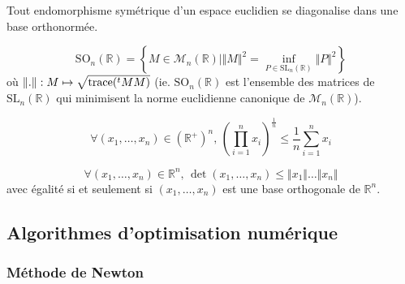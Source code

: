   \begin{application}
    Tout endomorphisme symétrique d'un espace euclidien se diagonalise dans une base orthonormée.
  \end{application}


  \begin{application}
    \[ \mathrm{SO}_n(\mathbb{R}) = \left\{ M \in \mathcal{M}_n(\mathbb{R}) \mid \Vert M \Vert^2 = \inf_{P \in \mathrm{SL}_n(\mathbb{R})} \Vert P \Vert^2 \right\} \]
    où $\Vert . \Vert : M \mapsto \sqrt{\operatorname{trace}(\mathstrut ^t MM)}$ (ie. $\mathrm{SO}_n(\mathbb{R})$ est l'ensemble des matrices de $\mathrm{SL}_n(\mathbb{R})$ qui minimisent la norme euclidienne canonique de $\mathcal{M}_n(\mathbb{R})$).
  \end{application}


  \begin{application}
    \[ \forall (x_1, \dots, x_n) \in (\mathbb{R}^+)^n, \, \left( \prod_{i=1}^{n} x_i \right)^{\frac{1}{n}} \leq \frac{1}{n} \sum_{i=1}^n x_i \]
  \end{application}


  \begin{application}
    \[ \forall (x_1, \dots, x_n) \in \mathbb{R}^n, \, \det(x_1, \dots, x_n) \leq \Vert x_1 \Vert \dots \Vert x_n \Vert \]
    avec égalité si et seulement si $(x_1, \dots, x_n)$ est une base orthogonale de $\mathbb{R}^n$.
  \end{application}

  \subsection{Algorithmes d'optimisation numérique}

  \subsubsection{Méthode de Newton}


